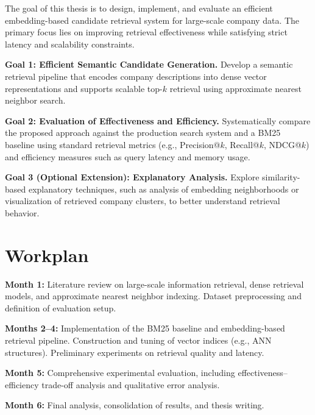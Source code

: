 \documentclass[a4paper]{scrartcl}
\begin{document}
The goal of this thesis is to design, implement, and evaluate an efficient embedding-based candidate retrieval system for large-scale company data. The primary focus lies on improving retrieval effectiveness while satisfying strict latency and scalability constraints.

\noindent \textbf{Goal 1: Efficient Semantic Candidate Generation.}  
Develop a semantic retrieval pipeline that encodes company descriptions into dense vector representations and supports scalable top-$k$ retrieval using approximate nearest neighbor search.

\noindent \textbf{Goal 2: Evaluation of Effectiveness and Efficiency.}  
Systematically compare the proposed approach against the production search system and a BM25 baseline using standard retrieval metrics (e.g., Precision@$k$, Recall@$k$, NDCG@$k$) and efficiency measures such as query latency and memory usage.

\noindent \textbf{Goal 3 (Optional Extension): Explanatory Analysis.}  
Explore similarity-based explanatory techniques, such as analysis of embedding neighborhoods or visualization of retrieved company clusters, to better understand retrieval behavior.

\section{Workplan}

\noindent \textbf{Month 1:}  
Literature review on large-scale information retrieval, dense retrieval models, and approximate nearest neighbor indexing. Dataset preprocessing and definition of evaluation setup.

\noindent \textbf{Months 2--4:}  
Implementation of the BM25 baseline and embedding-based retrieval pipeline. Construction and tuning of vector indices (e.g., ANN structures). Preliminary experiments on retrieval quality and latency.

\noindent \textbf{Month 5:}  
Comprehensive experimental evaluation, including effectiveness--efficiency trade-off analysis and qualitative error analysis.

\noindent \textbf{Month 6:}  
Final analysis, consolidation of results, and thesis writing.
\newpage
\end{document}
